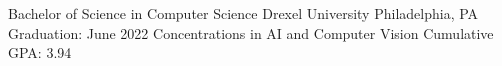 
\begin{cventries}
  \cventry
    {Bachelor of Science in Computer Science} %
    {Drexel University} %
    {Philadelphia, PA} %
    {Graduation: June 2022} %
    {}
  \vspace*{-.4cm}
  \cventry
    {Concentrations in AI and Computer Vision}
    {}
    {}
    {Cumulative GPA: 3.94}
    {}
\end{cventries}
